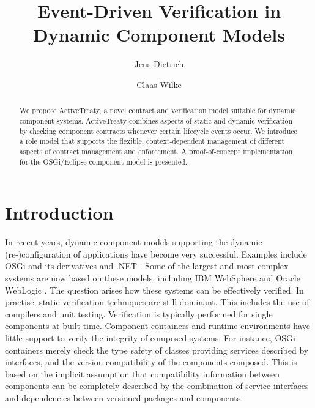 \documentclass{llncs}
\begin{document}
\title{Event-Driven Verification in Dynamic Component Models}

\author{Jens Dietrich \and Claas Wilke}


\maketitle



\begin{abstract}

We propose ActiveTreaty, a novel contract and verification model suitable for dynamic component systems. ActiveTreaty combines aspects of static and dynamic verification by checking component contracts whenever certain lifecycle events occur. We introduce a role model that supports the flexible, context-dependent management of different aspects of contract management and enforcement. 
A proof-of-concept implementation for the OSGi/Eclipse component model is presented. 

\end{abstract}



\section{Introduction}

In recent years, dynamic component models supporting the dynamic (re-)\-con\-fi\-gu\-ra\-tion of applications have become very successful. Examples include OSGi \cite{OSGI} and its derivatives and .NET \cite{TODO}. Some of the largest and most complex systems are now based on these models, including IBM WebSphere \cite{TODO} and Oracle WebLogic \cite{TODO}. The question arises how these systems can be effectively verified. In practise, static verification techniques are still dominant. This includes the use of compilers and unit testing. Verification is typically performed for single components at built-time. Component containers and runtime environments have little support to verify the integrity of composed systems. For instance, OSGi containers merely check the type safety of classes providing services described by interfaces, and the version compatibility of the components composed. This is based on the implicit assumption that compatibility information between components can be completely described by the combination of service interfaces and dependencies between versioned packages and components. 
\end{document}
